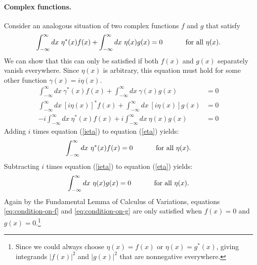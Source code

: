 \documentclass[11pt]{article}
\numberwithin{equation}{section}
\begin{document}
\paragraph{Complex functions.}
Consider an analogous situation of two complex functions $f$ and $g$ that satisfy
\begin{align}
\label{eta}
\int_{-\infty}^\infty dx\
	\eta^*(x)f(x)
+\int_{-\infty}^\infty dx\
	\eta(x)g(x)
=
	0
\sp\text{ for all $\eta(x)$.}
\end{align}
We can show that this can only be satisfied if both $f(x)$ and $g(x)$ separately vanish everywhere. Since $\eta(x)$ is arbitrary, this equation must hold for some other function $\gamma(x) = i \eta(x)$.
\begin{align}
\int_{-\infty}^\infty dx\
	\gamma^*(x)f(x)
+\int_{-\infty}^\infty dx\
	\gamma(x)g(x)
&=
	0
\\[1ex]
\int_{-\infty}^\infty dx\
	[i \eta(x) ]^* f(x)
+\int_{-\infty}^\infty dx\
	[i \eta(x)] g(x)
&=
	0
\\[1ex]
   \label{ieta}
    -i 
    \int_{-\infty}^\infty dx\
	\eta^*(x)  f(x)
+ 
    i \int_{-\infty}^\infty dx\
	\eta(x) g(x)
&=
	0
\end{align}
Adding $i$ times equation (\ref{ieta}) to equation (\ref{eta}) yields:
\begin{equation}
\label{eq:condition-on-f}
	\int_{-\infty}^\infty
	dx\ 
	\eta^*(x)f(x)=0
\sp
  \text{ for all $\eta(x)$.}
\end{equation}
Subtracting $i$ times equation (\ref{ieta}) to equation (\ref{eta}) yields:
\begin{equation}
\label{eq:condition-on-g}
	\int_{-\infty}^\infty
	dx\
	\eta(x)g(x)=0
\sp
  \text{ for all $\eta(x)$.}
\end{equation}
Again by the Fundamental Lemma of Calculus of Variations, equations \ref{eq:condition-on-f} and \ref{eq:condition-on-g} are only satisfied when $f(x)=0$ and $g(x)=0$.\footnote{Since we could always choose $\eta(x)=f(x)$ or $\eta(x)=g^*(x)$, giving integrands $|f(x)|^2$ and $|g(x)|^2$ that are nonnegative everywhere.}
\end{document}
